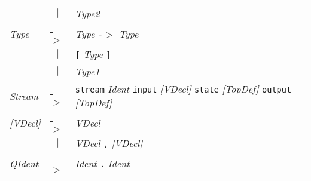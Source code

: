 \documentclass{article}
\begin{document}
\begin{center}
\begin{tabular}{lll}
 & \multicolumn{1}{c}{\textbf{$|$}} & \textit{Type2} \\
\textit{Type} & -$>$ & \textit{Type} \texttt{-$>$} \textit{Type} \\
 & \multicolumn{1}{c}{\textbf{$|$}} & \texttt{[} \textit{Type} \texttt{]} \\
 & \multicolumn{1}{c}{\textbf{$|$}} & \textit{Type1} \\
\textit{Stream} & -$>$ & \texttt{stream} \textit{Ident} \texttt{input} \textit{[VDecl]} \texttt{state} \textit{[TopDef]} \texttt{output} \textit{[TopDef]} \\
\textit{[VDecl]} & -$>$ & \textit{VDecl} \\
 & \multicolumn{1}{c}{\textbf{$|$}} & \textit{VDecl} \texttt{,} \textit{[VDecl]} \\
\textit{QIdent} & -$>$ & \textit{Ident} \texttt{.} \textit{Ident} \\
\end{tabular}\end{center}

\end{document}
